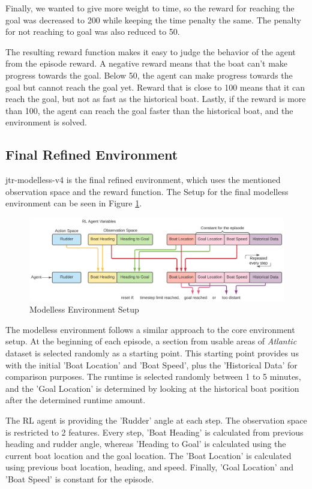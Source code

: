 \documentclass[12pt,twoside]{report}
\begin{document}
Finally, we wanted to give more weight to time, so the reward for reaching the goal was decreased to 200 while keeping the time penalty the same. The penalty for not reaching to goal was also reduced to 50.

The resulting reward function makes it easy to judge the behavior of the agent from the episode reward. A negative reward means that the boat can't make progress towards the goal. Below 50, the agent can make progress towards the goal but cannot reach the goal yet. Reward that is close to 100 means that it can reach the goal, but not as fast as the historical boat. Lastly, if the reward is more than 100, the agent can reach the goal faster than the historical boat, and the environment is solved.

\subsection{Final Refined Environment}
jtr-modelless-v4 is the final refined environment, which uses the mentioned observation space and the reward function. The Setup for the final modelless environment can be seen in Figure \ref{fig:modelless-env-setup}.

\begin{figure}[htbp]
\includegraphics[width=1.1\textwidth,center]{figures/Contribution/jtr-modelless.png}
\caption{Modelless Environment Setup}
\label{fig:modelless-env-setup}
\end{figure}

The modelless environment follows a similar approach to the core environment setup. At the beginning of each episode, a section from usable areas of \textit{Atlantic} dataset is selected randomly as a starting point. This starting point provides us with the initial 'Boat Location' and 'Boat Speed', plus the 'Historical Data' for comparison purposes. The runtime is selected randomly between 1 to 5 minutes, and the 'Goal Location' is determined by looking at the historical boat position after the determined runtime amount.

The RL agent is providing the 'Rudder' angle at each step. The observation space is restricted to 2 features. Every step, 'Boat Heading' is calculated from previous heading and rudder angle, whereas 'Heading to Goal' is calculated using the current boat location and the goal location. The 'Boat Location' is calculated using previous boat location, heading, and speed. Finally, 'Goal Location' and 'Boat Speed' is constant for the episode.
\end{document}
